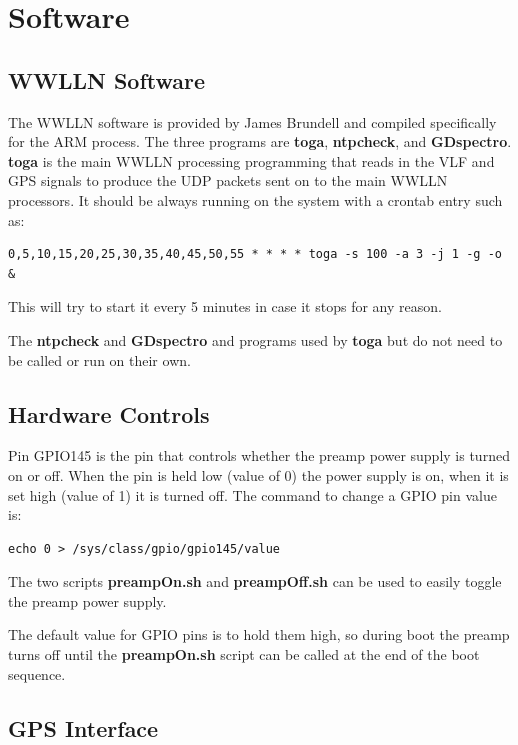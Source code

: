\section{Software}

\subsection{WWLLN Software}

The WWLLN software is provided by James Brundell and compiled specifically for the ARM process.
The three programs are {\bf toga}, {\bf ntpcheck}, and {\bf GDspectro}.
{\bf toga} is the main WWLLN processing programming that reads in the VLF and GPS signals to produce the UDP packets sent on to the main WWLLN processors.
It should be always running on the system with a crontab entry such as:

\begin{verbatim}
0,5,10,15,20,25,30,35,40,45,50,55 * * * * toga -s 100 -a 3 -j 1 -g -o &
\end{verbatim}

This will try to start it every 5 minutes in case it stops for any reason.

The {\bf ntpcheck} and {\bf GDspectro} and programs used by {\bf toga} but do not need to be called or run on their own.

\subsection{Hardware Controls}

Pin GPIO145 is the pin that controls whether the preamp power supply is turned on or off.
When the pin is held low (value of 0) the power supply is on, when it is set high (value of 1) it is turned off.
The command to change a GPIO pin value is:

\begin{verbatim}
echo 0 > /sys/class/gpio/gpio145/value
\end{verbatim}

The two scripts {\bf preampOn.sh} and {\bf preampOff.sh} can be used to easily toggle the preamp power supply.

The default value for GPIO pins is to hold them high, so during boot the preamp turns off until the {\bf preampOn.sh} script can be called at the end of the boot sequence.

\subsection{GPS Interface}

